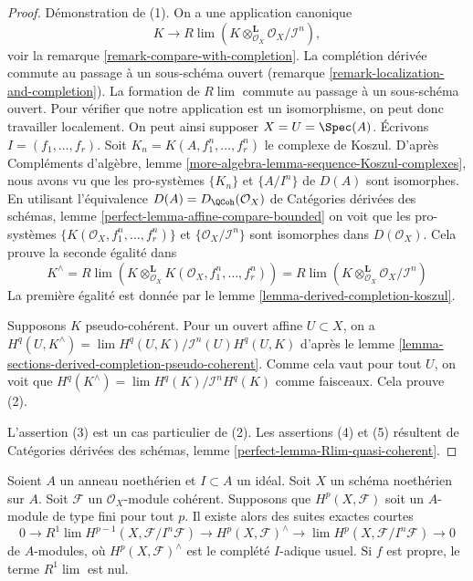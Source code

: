 \begin{proof}
Démonstration de (1). On a une application canonique
$$
K \longrightarrow
R\lim (K \otimes_{\mathcal{O}_X}^\mathbf{L} \mathcal{O}_X/\mathcal{I}^n),
$$
voir la remarque \ref{remark-compare-with-completion}.
La complétion dérivée commute au passage à un sous-schéma ouvert
(remarque \ref{remark-localization-and-completion}).
La formation de $R\lim$ commute au passage à un sous-schéma ouvert.
Pour vérifier que notre application est un isomorphisme, on peut donc travailler localement.
On peut ainsi supposer $X = U = \Spec(A)$.
Écrivons $I = (f_1, \ldots, f_r)$. Soit
$K_n = K(A, f_1^n, \ldots, f_r^n)$ le complexe de Koszul.
D'après Compléments d'algèbre, lemme \ref{more-algebra-lemma-sequence-Koszul-complexes},
nous avons vu que les pro-systèmes $\{K_n\}$ et
$\{A/I^n\}$ de $D(A)$ sont isomorphes.
En utilisant l'équivalence $D(A) = D_{\QCoh}(\mathcal{O}_X)$
de Catégories dérivées des schémas, lemme
\ref{perfect-lemma-affine-compare-bounded}
on voit que les pro-systèmes $\{K(\mathcal{O}_X, f_1^n, \ldots, f_r^n)\}$
et $\{\mathcal{O}_X/\mathcal{I}^n\}$ sont isomorphes dans
$D(\mathcal{O}_X)$. Cela prouve la seconde égalité dans
$$
K^\wedge = R\lim \left(
K \otimes_{\mathcal{O}_X}^\mathbf{L} K(\mathcal{O}_X, f_1^n, \ldots, f_r^n)
\right) =
R\lim (K \otimes_{\mathcal{O}_X}^\mathbf{L} \mathcal{O}_X/\mathcal{I}^n)
$$
La première égalité est donnée par le
lemme \ref{lemma-derived-completion-koszul}.

\medskip\noindent
Supposons $K$ pseudo-cohérent. Pour un ouvert affine $U \subset X$,
on a $H^q(U, K^\wedge) = \lim H^q(U, K)/\mathcal{I}^n(U)H^q(U, K)$
d'après le lemme \ref{lemma-sections-derived-completion-pseudo-coherent}.
Comme cela vaut pour tout $U$, on voit que
$H^q(K^\wedge) = \lim H^q(K)/\mathcal{I}^nH^q(K)$ comme faisceaux.
Cela prouve (2).

\medskip\noindent
L'assertion (3) est un cas particulier de (2).
Les assertions (4) et (5) résultent de
Catégories dérivées des schémas, lemme
\ref{perfect-lemma-Rlim-quasi-coherent}.
\end{proof}

\begin{lemma}
\label{lemma-formal-functions}
Soient $A$ un anneau noethérien et $I \subset A$ un idéal. Soit $X$ un
schéma noethérien sur $A$. Soit $\mathcal{F}$ un
$\mathcal{O}_X$-module cohérent. Supposons que $H^p(X, \mathcal{F})$ soit
un $A$-module de type fini pour tout $p$. Il existe alors des suites exactes courtes
$$
0 \to R^1\lim H^{p - 1}(X, \mathcal{F}/I^n\mathcal{F}) \to
H^p(X, \mathcal{F})^\wedge \to \lim H^p(X, \mathcal{F}/I^n\mathcal{F}) \to 0
$$
de $A$-modules, où $H^p(X, \mathcal{F})^\wedge$ est le complété $I$-adique
usuel. Si $f$ est propre, le terme $R^1\lim$ est nul.
\end{lemma}

